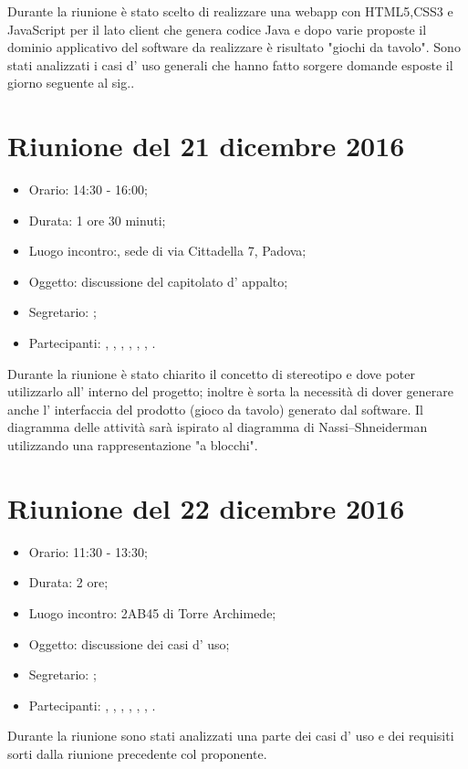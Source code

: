Durante la riunione è stato scelto di realizzare una webapp con HTML5,CSS3 e JavaScript per il lato client che genera codice Java e dopo varie proposte il dominio applicativo del software da realizzare è risultato "giochi da tavolo". 
Sono stati analizzati i casi d' uso generali che hanno fatto sorgere domande esposte il giorno seguente al sig.\GP.



\section{Riunione del 21 dicembre 2016}

\begin{itemize}
	\item Orario: 14:30 - 16:00;
	\item Durata: 1 ore 30 minuti;
	\item Luogo incontro:\ZU, sede di via Cittadella 7, Padova; 
	\item Oggetto: discussione del capitolato d' appalto;
	\item Segretario: \AZ; 
	\item Partecipanti: \GP, \AZ, \GG, \LB, \LS, \MM, \PB.
\end{itemize}

Durante la riunione è stato chiarito il concetto di stereotipo e dove poter utilizzarlo all' interno del progetto; inoltre è sorta la necessità di dover generare anche l' interfaccia del prodotto (gioco da tavolo) generato dal software. Il diagramma delle attività sarà ispirato al diagramma di Nassi–Shneiderman utilizzando una rappresentazione "a blocchi".



\section{Riunione del 22 dicembre 2016}

\begin{itemize}
	\item Orario: 11:30 - 13:30;
	\item Durata: 2 ore;
	\item Luogo incontro: 2AB45 di Torre Archimede; 
	\item Oggetto: discussione dei casi d' uso;
	\item Segretario: \PB; 
	\item Partecipanti: \GP, \AZ, \GG, \LB, \LS, \MM, \PB.
\end{itemize}

Durante la riunione sono stati analizzati una parte dei casi d' uso e dei requisiti sorti dalla riunione precedente col proponente.

